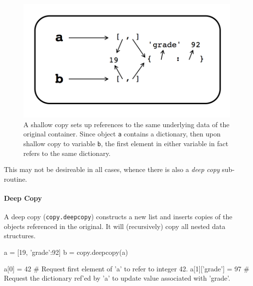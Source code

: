 \documentclass[12pt,letterpaper,twoside]{article}
\begin{document}
\begin{enumerate}
\begin{figure}[h]
\centering
\includegraphics[scale=0.35]{fig/shallow-copy-mutables.png}
\caption{A shallow copy sets up references to the same underlying data of the original container. Since object \texttt{a} contains a dictionary,
then upon shallow copy to variable \texttt{b}, the first element in either variable in fact refers to the same dictionary.}
\end{figure}

This may not be desireable in all cases, whence there is also a \emph{deep copy} sub-routine.

\paragraph{Deep Copy} A deep copy (\texttt{copy.deepcopy}) constructs a new list and inserts
copies of the objects referenced in the original. It will (recursively) copy all
nested data structures. 

\begin{python}
a = [19, {'grade':92}]
b = copy.deepcopy(a)

a[0] = 42           # Request first element of 'a' to refer to integer 42.
a[1]['grade'] = 97  # Request the dictionary ref'ed by 'a' to update value associated with 'grade'. 
\end{python}


\end{enumerate}
\end{document}
